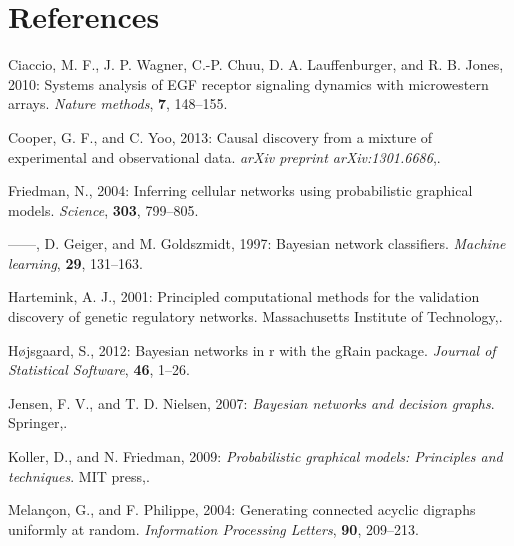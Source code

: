 \documentclass[twocol]{ametsoc}
\newlength{\cslhangindent}
\newlength{\cslentryspacingunit} %
\newenvironment{CSLReferences}[2] %
 {%
  \setlength{\parindent}{0pt}
  \ifodd #1
  \let\oldpar\par
  \def\par{\hangindent=\cslhangindent\oldpar}
  \fi
  \setlength{\parskip}{#2\cslentryspacingunit}
 }%
 {}
\begin{document}
\newpage

\hypertarget{references}{%
\section*{References}\label{references}}



\hypertarget{refs}{}
\begin{CSLReferences}{1}{0}
\leavevmode{}%
Ciaccio, M. F., J. P. Wagner, C.-P. Chuu, D. A. Lauffenburger, and R. B.
Jones, 2010: Systems analysis of EGF receptor signaling dynamics with
microwestern arrays. \emph{Nature methods}, \textbf{7}, 148--155.

\leavevmode{}%
Cooper, G. F., and C. Yoo, 2013: Causal discovery from a mixture of
experimental and observational data. \emph{arXiv preprint
arXiv:1301.6686},.

\leavevmode{}%
Friedman, N., 2004: Inferring cellular networks using probabilistic
graphical models. \emph{Science}, \textbf{303}, 799--805.

\leavevmode{}%
------, D. Geiger, and M. Goldszmidt, 1997: Bayesian network
classifiers. \emph{Machine learning}, \textbf{29}, 131--163.

\leavevmode{}%
Hartemink, A. J., 2001: Principled computational methods for the
validation discovery of genetic regulatory networks. Massachusetts
Institute of Technology,.

\leavevmode{}%
Højsgaard, S., 2012: Bayesian networks in r with the gRain package.
\emph{Journal of Statistical Software}, \textbf{46}, 1--26.

\leavevmode{}%
Jensen, F. V., and T. D. Nielsen, 2007: \emph{Bayesian networks and
decision graphs}. Springer,.

\leavevmode{}%
Koller, D., and N. Friedman, 2009: \emph{Probabilistic graphical models:
Principles and techniques}. MIT press,.

\leavevmode{}%
Melançon, G., and F. Philippe, 2004: Generating connected acyclic
digraphs uniformly at random. \emph{Information Processing Letters},
\textbf{90}, 209--213.


\end{CSLReferences}
\end{document}
